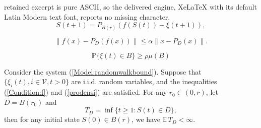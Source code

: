 \documentclass[10pt,a4paper]{amsart}
\begin{document}
retained excerpt is pure ASCII, so the delivered engine, XeLaTeX with its default Latin Modern text font, reports no missing character.
\begin{equation}\label{Model:randomwalkbound}
  S(t+1)=P_{B(r)}(f(S(t))+\xi(t+1)),
\end{equation}

\begin{equation}\label{Condition:f}
\| f(x)-P_D(f(x))\|\leq \alpha \| x-P_D(x)\|.
\end{equation}

\begin{equation}\label{prodensi}
  \mathbb{P}\{\xi(t)\in B\}\geq \rho \mu(B)
\end{equation}

\begin{lem}\label{Lem:mainbounded}
Consider the system  (\ref{Model:randomwalkbound}).
Suppose that $\{\xi_i(t), i\in\mathcal{V}, t>0\}$ are i.i.d. random variables, and the inequalities   (\ref{Condition:f}) and (\ref{prodensi}) are satisfied. For any $r_0\in(0,r)$, let $D=B(r_0)$ and
\begin{equation}\label{Equa:defofT}
  T_D=\inf\{t\geq 1:S(t)\in D\},
\end{equation}
then for any initial state $S(0)\in B(r)$, we have
$\mathbb{E}\,T_D<\infty.$
\end{lem}
\end{document}
